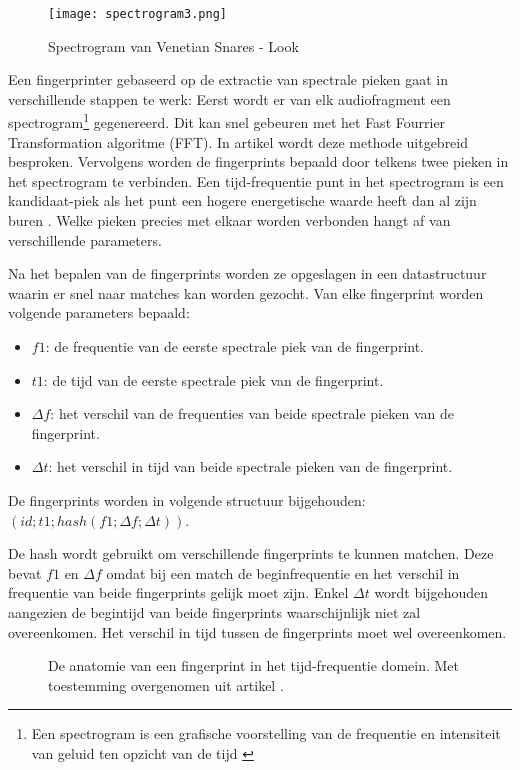 \begin{figure}[!h]
	\caption[Voorbeeld van een spectrogram]{Spectrogram van Venetian Snares - Look}
	\centering
	\texttt{[image: spectrogram3.png]}
\end{figure}
Een fingerprinter gebaseerd op de extractie van spectrale pieken gaat in verschillende stappen te werk: 
Eerst wordt er van elk audiofragment een spectrogram\footnote{Een spectrogram is een grafische voorstelling van de frequentie en intensiteit van geluid ten opzicht van de tijd \cite{spectrogram_dict}} gegenereerd. Dit kan snel gebeuren met het Fast Fourrier Transformation algoritme (FFT). In artikel \cite{oppenheim1970speech} wordt deze methode uitgebreid besproken. Vervolgens worden de fingerprints bepaald door telkens twee pieken in het spectrogram te verbinden. Een tijd-frequentie punt in het spectrogram is een kandidaat-piek als het punt een hogere energetische waarde heeft dan al zijn buren \cite{Wang2003a}. Welke pieken precies met elkaar worden verbonden hangt af van verschillende parameters.

Na het bepalen van de fingerprints worden ze opgeslagen in een datastructuur waarin er snel naar matches kan worden gezocht.
Van elke fingerprint worden volgende parameters bepaald:
\begin{itemize}[noitemsep]
	\item $ f1 $: de frequentie van de eerste spectrale piek van de fingerprint.
	\item $ t1 $: de tijd van de eerste spectrale piek van de fingerprint.
	\item $ \Delta f $: het verschil van de frequenties van beide spectrale pieken van de fingerprint.
	\item $ \Delta t $: het verschil in tijd van beide spectrale pieken van de fingerprint.
\end{itemize}

De fingerprints worden in volgende structuur bijgehouden: $ ( id; t1; hash(f1; \Delta f; \Delta t) ) $.

De hash wordt gebruikt om verschillende fingerprints te kunnen matchen. Deze bevat $ f1 $ en $ \Delta f $ omdat bij een match de beginfrequentie en het verschil in frequentie van beide fingerprints gelijk moet zijn. Enkel $ \Delta t $ wordt bijgehouden aangezien de begintijd van beide fingerprints waarschijnlijk niet zal overeenkomen. Het verschil in tijd tussen de fingerprints moet wel overeenkomen.

\begin{figure}[h]
	\captionsetup{width=0.7\textwidth}
	\caption[De anatomie van een fingerprint]{De anatomie van een fingerprint in het tijd-frequentie domein. Met toestemming overgenomen uit artikel \cite{six2015multimodal}.}
	\begin{center}
		\advance\parskip0.3cm
		
	\end{center}
\end{figure}

